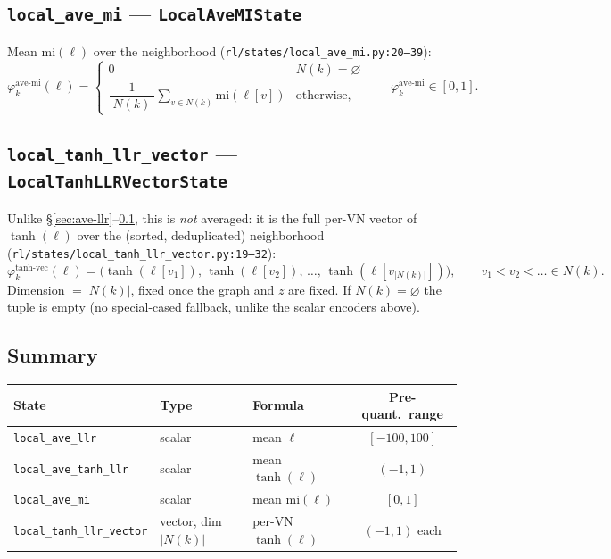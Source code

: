 \documentclass[11pt]{article}
\newcommand{\code}[1]{\texttt{#1}}
\newcommand{\file}[1]{\texttt{#1}}
\begin{document}
\subsection{\code{local\_ave\_mi} --- \code{LocalAveMIState}}
\label{sec:ave-mi}
Mean $\mathrm{mi}(\ell)$ over the neighborhood (\file{rl/states/local\_ave\_mi.py:20--39}):
\[
\varphi_k^{\mathrm{ave\text{-}mi}}(\ell) =
\begin{cases}
0 & N(k) = \varnothing \\[2pt]
\dfrac{1}{|N(k)|}\displaystyle\sum_{v\in N(k)} \mathrm{mi}(\ell[v]) & \text{otherwise,}
\end{cases}
\qquad \varphi_k^{\mathrm{ave\text{-}mi}} \in [0,1].
\]

\subsection{\code{local\_tanh\_llr\_vector} --- \code{LocalTanhLLRVectorState}}
Unlike \S\ref{sec:ave-llr}--\ref{sec:ave-mi}, this is \emph{not} averaged: it is the
full per-VN vector of $\tanh(\ell)$ over the (sorted, deduplicated) neighborhood
(\file{rl/states/local\_tanh\_llr\_vector.py:19--32}):
\[
\varphi_k^{\mathrm{tanh\text{-}vec}}(\ell) =
\big(\tanh(\ell[v_1]),\, \tanh(\ell[v_2]),\, \dots,\, \tanh(\ell[v_{|N(k)|}])\big),
\qquad v_1 < v_2 < \dots \in N(k).
\]
Dimension $=|N(k)|$, fixed once the graph and $z$ are fixed. If $N(k)=\varnothing$ the
tuple is empty (no special-cased fallback, unlike the scalar encoders above).

\subsection{Summary}
\begin{center}
\begin{tabular}{@{}lllc@{}}
\toprule
State & Type & Formula & Pre-quant.\ range \\
\midrule
\code{local\_ave\_llr} & scalar & mean $\ell$ & $[-100,100]$ \\
\code{local\_ave\_tanh\_llr} & scalar & mean $\tanh(\ell)$ & $(-1,1)$ \\
\code{local\_ave\_mi} & scalar & mean $\mathrm{mi}(\ell)$ & $[0,1]$ \\
\code{local\_tanh\_llr\_vector} & vector, dim $|N(k)|$ & per-VN $\tanh(\ell)$ & $(-1,1)$ each \\
\bottomrule
\end{tabular}
\end{center}
\end{document}
